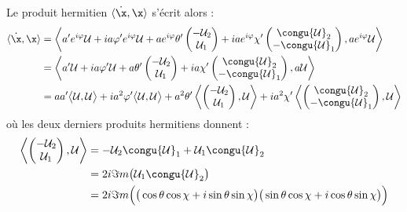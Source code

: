 \begin{annexe}
\begin{demo}
\begin{align*}
	\end{align*}
	\\
	Le produit hermitien $\langle \dot{\x}, \x \rangle$ s'écrit alors :
	\begin{align*}
		\langle \dot{\x}, \x \rangle 
		&= \left\langle a'e^{i\varphi}\mathcal{U} + ia\varphi'e^{i\varphi} \mathcal{U} + ae^{i\varphi}\theta'\begin{pmatrix} -\mathcal{U}_2 \\ \mathcal{U}_1 \end{pmatrix} + iae^{i\varphi}\chi'\begin{pmatrix} \congu{\mathcal{U}}_2 \\ -\congu{\mathcal{U}}_1 \end{pmatrix}, ae^{i\varphi}\mathcal{U} \right\rangle \\
		&= \left\langle a'\mathcal{U} + ia\varphi' \mathcal{U} + a\theta'\begin{pmatrix} -\mathcal{U}_2 \\ \mathcal{U}_1 \end{pmatrix} + ia\chi'\begin{pmatrix} \congu{\mathcal{U}}_2 \\ -\congu{\mathcal{U}}_1 \end{pmatrix}, a\mathcal{U} \right\rangle \\
		&= aa' \big\langle \mathcal{U}, \mathcal{U}\big\rangle  + ia^2\varphi' \big\langle \mathcal{U}, \mathcal{U}\big\rangle  + a^2\theta'\left\langle \begin{pmatrix} -\mathcal{U}_2 \\ \mathcal{U}_1 \end{pmatrix}, \mathcal{U} \right\rangle + ia^2\chi'\left\langle \begin{pmatrix} \congu{\mathcal{U}}_2 \\ -\congu{\mathcal{U}}_1 \end{pmatrix}, \mathcal{U} \right\rangle
	\end{align*}
	où les deux derniers produits hermitiens donnent :
	\begin{align*}
		\left\langle \begin{pmatrix} -\mathcal{U}_2 \\ \mathcal{U}_1 \end{pmatrix}, \mathcal{U} \right\rangle &= -\mathcal{U}_2\congu{\mathcal{U}}_1 + \mathcal{U}_1\congu{\mathcal{U}}_2 \\
		&= 2i\Im m\big(\mathcal{U}_1 \congu{\mathcal{U}}_2\big) \\
		&= 2i\Im m\Big(\big( \cos\theta \cos\chi + i \sin\theta \sin\chi \big) \big( \sin\theta \cos\chi + i \cos\theta \sin\chi \big)\Big) \\

\end{align*}
\end{demo}
\end{annexe}
